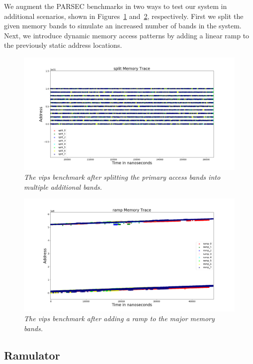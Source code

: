 We augment the PARSEC benchmarks in two ways to test our system in additional scenarios, shown in Figures~\ref{fig:vips_split} and~\ref{fig:vips_ramp}, respectively. First we split the given memory bands to simulate an increased number of bands in the system. Next, we introduce dynamic memory access patterns by adding a linear ramp to the previously static address locations. 

\begin{figure}[htbp]
		\includegraphics[width=\linewidth]{fig/vips_split.png}
		\caption{\it{The vips benchmark after splitting the primary access bands into multiple additional bands.}}
		\label{fig:vips_split}
\end{figure}


\begin{figure}[htbp]
		\includegraphics[width=\linewidth]{fig/vips_ramp.png}
		\caption{\it{The vips benchmark after adding a ramp to the major memory bands.}}
		\label{fig:vips_ramp}
\end{figure}


\subsection{Ramulator}

